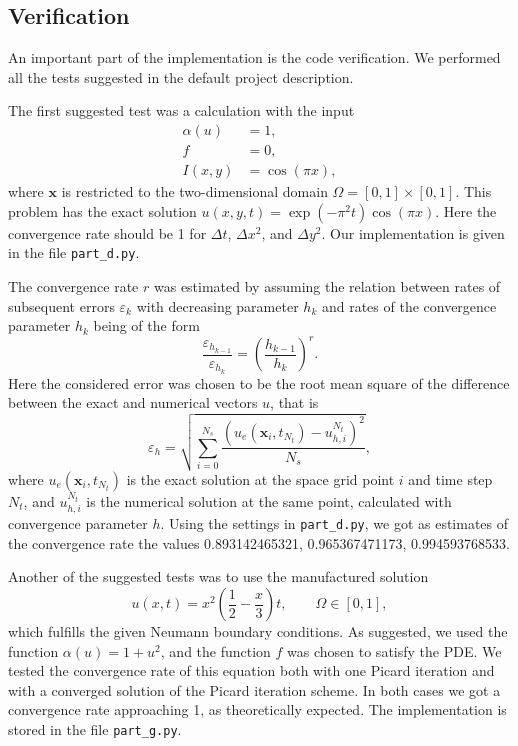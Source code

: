 \documentclass[twoside]{article}
\begin{document}
\subsection{Verification}

An important part of the implementation is the code verification. We performed all the tests suggested in the default project description. 

The first suggested test was a calculation with the input
\begin{align}
  \alpha(u) &= 1, \nonumber \\
  f &= 0, \nonumber \\
  I(x, y) &= \cos(\pi x),
\end{align}
where $\mathbf{x}$ is restricted to the two-dimensional domain $\Omega = [0, 1]\times [0, 1]$. This problem has the exact solution $u(x, y, t) = \exp(-\pi^{2}t)\cos(\pi x)$. Here the convergence rate should be 1 for $\Delta t$, $\Delta x^{2}$, and $\Delta y^{2}$. Our implementation is given in the file \verb+part_d.py+. 

The convergence rate $r$ was estimated by assuming the relation between rates of subsequent errors $\varepsilon_{k}$ with decreasing parameter $h_{k}$ and rates of the convergence parameter $h_{k}$ being of the form
\begin{equation}
  \frac{\varepsilon_{h_{k-1}}}{\varepsilon_{h_{k}}} = \left(\frac{h_{k-1}}{h_{k}}\right)^{r}.
\end{equation}
Here the considered error was chosen to be the root mean square of the difference between the exact and numerical vectors $u$, that is
\begin{equation}
  \varepsilon_{h} = \sqrt{\sum_{i=0}^{N_{s}}\frac{(u_{e}(\mathbf{x}_{i}, t_{N_{t}})-u_{h, i}^{N_{t}})^{2}}{N_{s}}},
\end{equation}
where $u_{e}(\mathbf{x}_{i}, t_{N_{t}})$ is the exact solution at the space grid point $i$ and time step $N_{t}$, and $u_{h, i}^{N_{t}}$ is the numerical solution at the same point, calculated with convergence parameter $h$. Using the settings in \verb+part_d.py+, we got as estimates of the convergence rate the values 0.893142465321, 0.965367471173, 0.994593768533.

Another of the suggested tests was to use the manufactured solution 
\begin{equation}
  u(x, t) = x^{2}\left( \frac{1}{2} - \frac{x}{3}\right)t, \qquad \Omega \in [0, 1],
\end{equation}
which fulfills the given Neumann boundary conditions. As suggested, we used the function $\alpha(u) = 1 + u^{2}$, and the function $f$ was chosen to satisfy the PDE. We tested the convergence rate of this equation both with one Picard iteration and with a converged solution of the Picard iteration scheme. In both cases we got a convergence rate approaching 1, as theoretically expected. The implementation is stored in the file \verb+part_g.py+.
\end{document}
